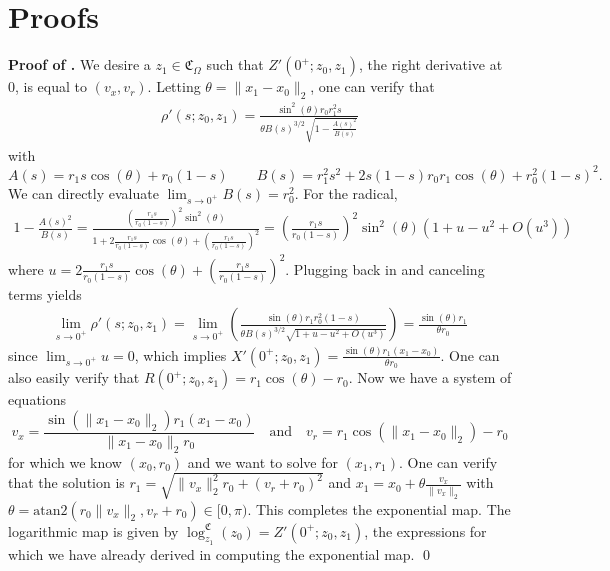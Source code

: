 \documentclass{article}
\begin{document}
\appendix

\section{Proofs} \label{sec: proof of main results}

\noindent \textbf{Proof of .} We desire a $z_1 \in \mathfrak{C}_\Omega$ such that $Z'(0^+; z_0, z_1)$, the right derivative at $0$, is equal to $(v_x, v_r).$ Letting $\theta = \|x_1 - x_0\|_2$, one can verify that 
\begin{align*}
    \rho'(s; z_0, z_1) = \frac{\sin^2(\theta)r_0r_1^2s}{\theta B(s)^{3/2}\sqrt{1 - \frac{A(s)^2}{B(s)}}}
\end{align*}
with 
\begin{equation*}
    A(s) = r_1s\cos(\theta) + r_0(1-s) \qquad B(s) = r_1^2s^2 + 2s(1-s)r_0r_1\cos(\theta) + r_0^2(1-s)^2.
\end{equation*}
We can directly evaluate $\lim_{s \rightarrow 0^+}B(s) = r_0^2$. For the radical,
\begin{align*}
    1 - \frac{A(s)^2}{B(s)} = \frac{\left(\frac{r_1s}{r_0(1-s)}\right)^2\sin^2(\theta)}{1 + 2\frac{r_1s}{r_0(1-s)}\cos(\theta) + \left(\frac{r_1s}{r_0(1-s)}\right)^2} = \left(\frac{r_1s}{r_0(1-s)}\right)^2\sin^2(\theta)\left(1 + u - u^2 + O(u^3)\right)
\end{align*}
where $u = 2\frac{r_1s}{r_0(1-s)}\cos(\theta) + \left(\frac{r_1s}{r_0(1-s)}\right)^2$. Plugging back in and canceling terms yields
\begin{align*}
    \lim_{s \rightarrow 0^+}\rho'(s; z_0, z_1) = \lim_{s\rightarrow 0^+}\left(\frac{\sin(\theta)r_1r_0^2(1-s)}{\theta B(s)^{3/2}\sqrt{1  + u - u^2 + O(u^3)}}\right) = \frac{\sin(\theta)r_1}{\theta r_0}
\end{align*}
since $\lim_{s \rightarrow 0^+}u = 0$, which implies $X'(0^+; z_0, z_1) = \frac{\sin(\theta)r_1(x_1 - x_0)}{\theta r_0}$. One can also easily verify that $R(0^+; z_0, z_1) = r_1\cos(\theta) - r_0$. Now we have a system of equations 
\begin{equation*}
    v_x = \frac{\sin(\|x_1 - x_0\|_2)r_1(x_1 - x_0)}{\|x_1 - x_0\|_2 r_0} \quad \text{and} \quad  v_r = r_1\cos(\|x_1 - x_0\|_2) - r_0
\end{equation*}
for which we know $(x_0, r_0)$ and we want to solve for $(x_1, r_1)$. One can verify that the solution is $r_1 = \sqrt{\|v_x\|_2^2r_0 + (v_r+r_0)^2}$ and $x_1 = x_0 + \theta\frac{v_x}{\|v_x\|_2}$ with $\theta = \text{atan2}(r_0\|v_x\|_2, v_r + r_0) \in [0, \pi)$. This completes the exponential map. The logarithmic map is given by
$\log^{\mathfrak{C}}_{z_1}(z_0) = Z'(0^+; z_0, z_1)$, the expressions for which we have already derived in computing the exponential map.
\qed{}
\\
\end{document}
